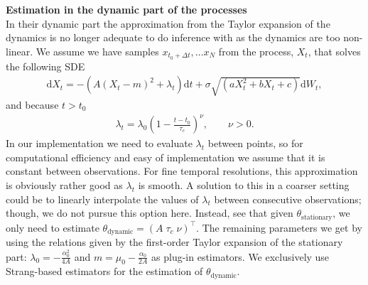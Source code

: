 \textbf{Estimation in the dynamic part of the processes}\\
In their dynamic part the approximation from the Taylor expansion of the dynamics is no longer adequate to do inference with as the dynamics are too non-linear. We assume we have samples $x_{t_0+\Delta t}, \dots x_{N}$ from the process, $X_t$, that solves the following SDE
\begin{align}
    \mathrm{d}X_t = -\left(A(X_t - m)^2 + \lambda_t\right)\mathrm{d}t + \sigma\sqrt{\left(aX_t^2 + bX_t + c\right)}\mathrm{d}W_t, 
\end{align}
and because $t>t_0$
\begin{align}
    \lambda_t = \lambda_0\left(1 - \frac{t - t_0}{\tau_c}\right)^\nu, \qquad \nu >0.
\end{align} 
In our implementation we need to evaluate $\lambda_t$ between points, so for computational efficiency and easy of implementation we assume that it is constant between observations. For fine temporal resolutions, this approximation is obviously rather good as $\lambda_t$ is smooth. A solution to this in a coarser setting could be to linearly interpolate the values of $\lambda_t$ between consecutive observations; though, we do not pursue this option here. Instead, see that given $\theta_{\mathrm{stationary}}$, we only need to estimate $\theta_{\mathrm{dynamic}} = (A\; \tau_c\; \nu)^\top$. The remaining parameters we get by using the relations given by the first-order Taylor expansion of the stationary part: $\lambda_0 = -\frac{\alpha_0^2}{4A}$ and $m = \mu_0 - \frac{\alpha_0}{2A}$ as plug-in estimators. We exclusively use Strang-based estimators for the estimation of $\theta_{\mathrm{dynamic}}$. \newpage
